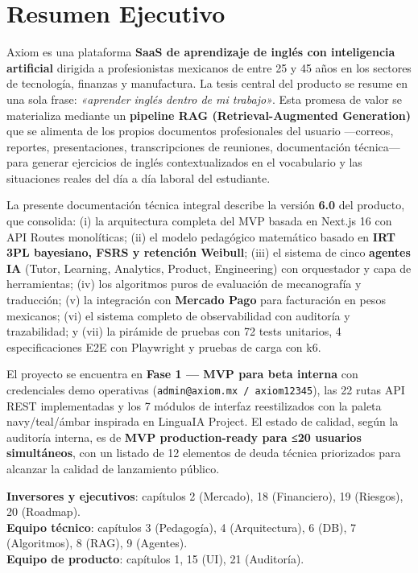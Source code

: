 \documentclass[10pt,a4paper,oneside]{report}
\begin{document}
\cleardoublepage
\tableofcontents

\chapter*{Resumen Ejecutivo}

Axiom es una plataforma \textbf{SaaS de aprendizaje de inglés con inteligencia artificial} dirigida a profesionistas mexicanos de entre 25 y 45 años en los sectores de tecnología, finanzas y manufactura. La tesis central del producto se resume en una sola frase: \textit{«aprender inglés dentro de mi trabajo»}. Esta promesa de valor se materializa mediante un \textbf{pipeline RAG (Retrieval-Augmented Generation)} que se alimenta de los propios documentos profesionales del usuario —correos, reportes, presentaciones, transcripciones de reuniones, documentación técnica— para generar ejercicios de inglés contextualizados en el vocabulario y las situaciones reales del día a día laboral del estudiante.

La presente documentación técnica integral describe la versión \textbf{6.0} del producto, que consolida: (i) la arquitectura completa del MVP basada en Next.js 16 con API Routes monolíticas; (ii) el modelo pedagógico matemático basado en \textbf{IRT 3PL bayesiano, FSRS y retención Weibull}; (iii) el sistema de cinco \textbf{agentes IA} (Tutor, Learning, Analytics, Product, Engineering) con orquestador y capa de herramientas; (iv) los algoritmos puros de evaluación de mecanografía y traducción; (v) la integración con \textbf{Mercado Pago} para facturación en pesos mexicanos; (vi) el sistema completo de observabilidad con auditoría y trazabilidad; y (vii) la pirámide de pruebas con 72 tests unitarios, 4 especificaciones E2E con Playwright y pruebas de carga con k6.

El proyecto se encuentra en \textbf{Fase 1 — MVP para beta interna} con credenciales demo operativas (\texttt{admin@axiom.mx / axiom12345}), las 22 rutas API REST implementadas y los 7 módulos de interfaz reestilizados con la paleta navy/teal/ámbar inspirada en LinguaIA Project. El estado de calidad, según la auditoría interna, es de \textbf{MVP production-ready para ≤20 usuarios simultáneos}, con un listado de 12 elementos de deuda técnica priorizados para alcanzar la calidad de lanzamiento público.

\begin{tcolorbox}[infobox,title=Lectura recomendada]
\textbf{Inversores y ejecutivos}: capítulos 2 (Mercado), 18 (Financiero), 19 (Riesgos), 20 (Roadmap).\\
\textbf{Equipo técnico}: capítulos 3 (Pedagogía), 4 (Arquitectura), 6 (DB), 7 (Algoritmos), 8 (RAG), 9 (Agentes).\\
\textbf{Equipo de producto}: capítulos 1, 15 (UI), 21 (Auditoría).
\end{tcolorbox}
\end{document}
